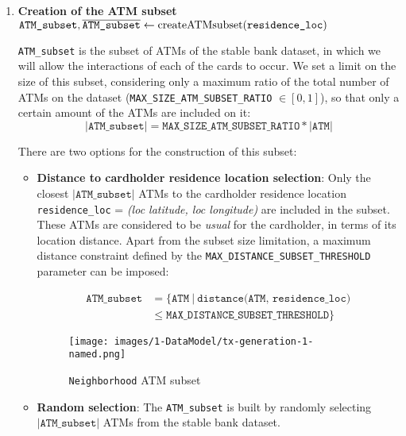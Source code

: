 \begin{enumerate}
    \item \textbf{Creation of the ATM subset} \\
    {\footnotesize \textcolor{teal}{$\texttt{ATM\_subset}, \overline{\texttt{ATM\_subset}} \gets \text{createATMsubset(\texttt{residence\_loc})}$}}

    \texttt{ATM\_subset} is the subset of ATMs of the stable bank dataset, in which we will allow the interactions of each of the cards to occur. We set a limit on the size of this subset, considering only a maximum ratio of the total number of ATMs on the dataset (\texttt{MAX\_SIZE\_ATM\_SUBSET\_RATIO} $\in [0,1]$), so that only a certain amount of the ATMs are included on it: 
    $$|\texttt{ATM\_subset}| = \texttt{MAX\_SIZE\_ATM\_SUBSET\_RATIO} * |\texttt{ATM}|$$ 

    There are two options for the construction of this subset:
    \begin{itemize}
        \item \textbf{Distance to cardholder residence location selection}: Only the closest $|\texttt{ATM\_subset}|$ ATMs to the cardholder residence location \texttt{residence\_loc} = \emph{(loc latitude, loc longitude)} are included in the subset. These ATMs are considered to be \textit{usual} for the cardholder, in terms of its location distance. Apart from the subset size limitation, a maximum distance constraint defined by the
        \texttt{MAX\_DISTANCE\_SUBSET\_THRESHOLD} parameter can be imposed:
        
        \begin{align*}
        \texttt{ATM\_subset} &= \{\texttt{ATM}\ |\ \texttt{distance(ATM, residence\_loc)} \\
        &\leq \texttt{MAX\_DISTANCE\_SUBSET\_THRESHOLD}\}
        \end{align*}
        
            \begin{figure}[H]
              \centering
              \texttt{[image: images/1-DataModel/tx-generation-1-named.png]}
              \caption{\texttt{Neighborhood} ATM subset}
            \end{figure}
    
        \item \textbf{Random selection}: The \texttt{ATM\_subset} is built by randomly selecting $|\texttt{ATM\_subset}|$ ATMs from the stable bank dataset.
    \end{itemize}


\end{enumerate}
